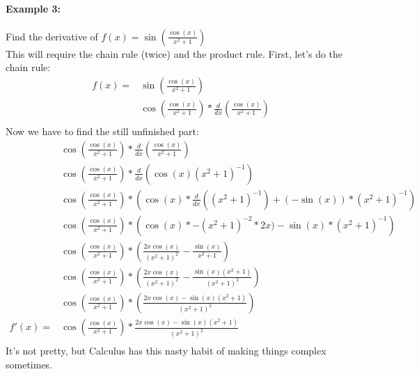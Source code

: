 \documentclass[../revisedmain.tex]{subfiles}
\begin{document}
\paragraph{Example 3:} Find the derivative of \(f(x)=\sin\left(\displaystyle\frac{\cos(x)}{x^2+1}\right)\)\\This will require the chain rule (twice) and the product rule. First, let's do the chain rule:
\begin{equation}
	\begin{split}
	f(x)=&\sin\left(\frac{\cos(x)}{x^2+1}\right)\\
	&\cos\left(\frac{\cos(x)}{x^2+1}\right)*\frac{d}{dx}\left(\frac{\cos(x)}{x^2+1}\right)\\
	\end{split}
\end{equation}
Now we have to find the still unfinished part:
\begin{equation}
	\begin{split}
	&\cos\left(\frac{\cos(x)}{x^2+1}\right)*\frac{d}{dx}\left(\frac{\cos(x)}{x^2+1}\right)\\
	&\cos\left(\frac{\cos(x)}{x^2+1}\right)*\frac{d}{dx}\left(\cos(x)(x^2+1)^{-1}\right)\\
	&\cos\left(\frac{\cos(x)}{x^2+1}\right)*\left(\cos(x)*\frac{d}{dx}\left((x^2+1)^{-1}\right)+(-\sin(x))*(x^2+1)^{-1}\right)\\
	&\cos\left(\frac{\cos(x)}{x^2+1}\right)*\left(\cos(x)*-(x^2+1)^{-2}*2x)-\sin(x)*(x^2+1)^{-1}\right)\\
	&\cos\left(\frac{\cos(x)}{x^2+1}\right)*\left(\frac{2x\cos(x)}{(x^2+1)^2}-\frac{\sin(x)}{x^2+1}\right)\\
	&\cos\left(\frac{\cos(x)}{x^2+1}\right)*\left(\frac{2x\cos(x)}{(x^2+1)^2}-\frac{\sin(x)(x^2+1)}{(x^2+1)^2}\right)\\
	&\cos\left(\frac{\cos(x)}{x^2+1}\right)*\left(\frac{2x\cos(x)-\sin(x)(x^2+1)}{(x^2+1)^2}\right)\\
	f'(x)=&\cos\left(\frac{\cos(x)}{x^2+1}\right)*\frac{2x\cos(x)-\sin(x)(x^2+1)}{(x^2+1)^2}\\
	\end{split}
\end{equation}
It's not pretty, but Calculus has this nasty habit of making things complex sometimes.\\
\end{document}
